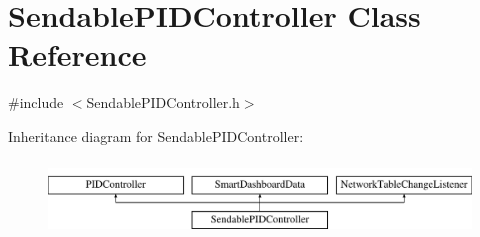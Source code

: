 \hypertarget{classSendablePIDController}{
\section{SendablePIDController Class Reference}
\label{classSendablePIDController}
}


{\ttfamily \#include $<$SendablePIDController.h$>$}

Inheritance diagram for SendablePIDController:\begin{figure}[H]
\begin{center}
\leavevmode
\includegraphics[height=2.000000cm]{classSendablePIDController}
\end{center}
\end{figure}
